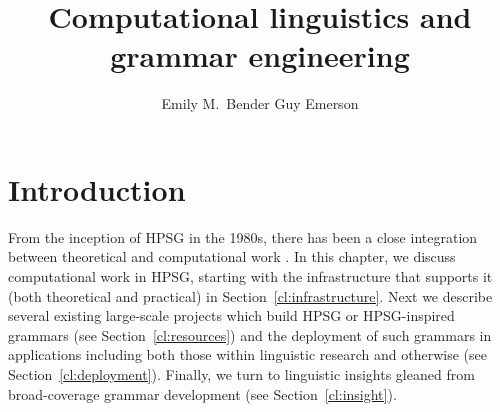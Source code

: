 \documentclass[output=paper,nonflat]{langsci/langscibook}
\author{%
	Emily M.\ Bender\affiliation{University of Washington}%
	\lastand Guy Emerson\affiliation{University of Cambridge}
}
\title{Computational linguistics and grammar engineering}
\begin{document}
\maketitle

\label{chap-cl}



\section{Introduction}


From the inception of HPSG in the 1980s,
there has been a close integration between theoretical and computational work
.
In this chapter, we discuss computational work in HPSG,
starting with the infrastructure that supports it (both theoretical and practical) in Section~\ref{cl:infrastructure}.
Next we describe several existing large-scale projects which build HPSG or HPSG-inspired grammars
(see Section~\ref{cl:resources})
and the deployment of such grammars in applications including both those within linguistic research and otherwise
(see Section~\ref{cl:deployment}).
Finally, we turn to linguistic insights gleaned from broad-coverage grammar development
(see Section~\ref{cl:insight}).


\end{document}
